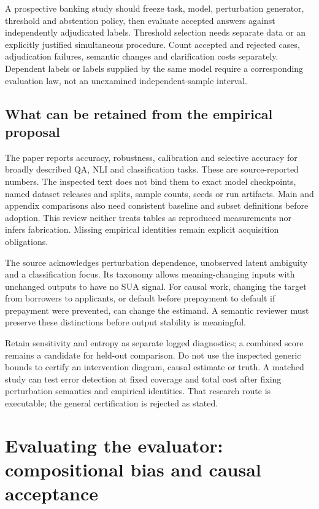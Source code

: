 A prospective banking study should freeze task, model, perturbation generator,
threshold and abstention policy, then evaluate accepted answers against
independently adjudicated labels. Threshold selection needs separate data or
an explicitly justified simultaneous procedure. Count accepted and rejected
cases, adjudication failures, semantic changes and clarification costs
separately. Dependent labels or labels supplied by the same model require a
corresponding evaluation law, not an unexamined independent-sample interval.

\subsection{What can be retained from the empirical proposal}
The paper reports accuracy, robustness, calibration and selective accuracy for
broadly described QA, NLI and classification tasks. These are source-reported
numbers. The inspected text does not bind them to exact model checkpoints,
named dataset releases and splits, sample counts, seeds or run artifacts.
Main and appendix comparisons also need consistent baseline and subset
definitions before adoption. This review neither treats tables as reproduced
measurements nor infers fabrication. Missing empirical identities remain
explicit acquisition obligations. \citep{exec23_sua_original}

The source acknowledges perturbation dependence, unobserved latent ambiguity
and a classification focus. Its taxonomy allows meaning-changing inputs with
unchanged outputs to have no SUA signal. For causal work, changing the target
from borrowers to applicants, or default before prepayment to default if
prepayment were prevented, can change the estimand. A semantic reviewer must
preserve these distinctions before output stability is meaningful.
\citep{exec23_sua_original}

Retain sensitivity and entropy as separate logged diagnostics; a combined
score remains a candidate for held-out comparison. Do not use the inspected
generic bounds to certify an intervention diagram, causal estimate or truth.
A matched study can test error detection at fixed coverage and total cost
after fixing perturbation semantics and empirical identities. That research
route is executable; the general certification is rejected as stated.


\section{Evaluating the evaluator: compositional bias and causal acceptance}
\label{sec:exec24-judge-bias}

